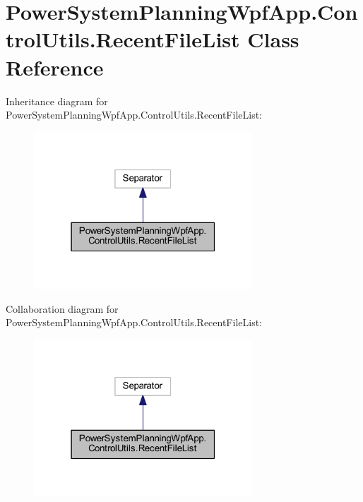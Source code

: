 \hypertarget{class_power_system_planning_wpf_app_1_1_control_utils_1_1_recent_file_list}{}\section{Power\+System\+Planning\+Wpf\+App.\+Control\+Utils.\+Recent\+File\+List Class Reference}
\label{class_power_system_planning_wpf_app_1_1_control_utils_1_1_recent_file_list}


Inheritance diagram for Power\+System\+Planning\+Wpf\+App.\+Control\+Utils.\+Recent\+File\+List\+:\nopagebreak
\begin{figure}[H]
\begin{center}
\leavevmode
\includegraphics[width=232pt]{class_power_system_planning_wpf_app_1_1_control_utils_1_1_recent_file_list__inherit__graph}
\end{center}
\end{figure}


Collaboration diagram for Power\+System\+Planning\+Wpf\+App.\+Control\+Utils.\+Recent\+File\+List\+:\nopagebreak
\begin{figure}[H]
\begin{center}
\leavevmode
\includegraphics[width=232pt]{class_power_system_planning_wpf_app_1_1_control_utils_1_1_recent_file_list__coll__graph}
\end{center}
\end{figure}
